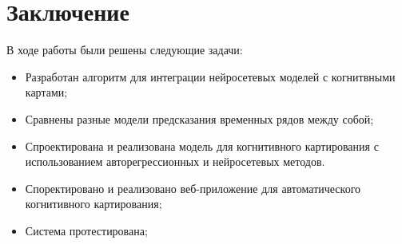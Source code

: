 \chapter*{Заключение}


В ходе работы были решены следующие задачи:

\begin{itemize}
	\item Разработан алгоритм для интеграции нейросетевых моделей с когнитвными картами;
	\item Сравнены разные модели предсказания временных рядов между собой;
	\item Спроектирована и реализована модель для когнитивного картирования с использованием
	авторегрессионных и нейросетевых методов.
	\item Споректировано и реализовано веб-приложение для автоматического когнитивного картирования;
	\item Система протестирована;
\end{itemize}




